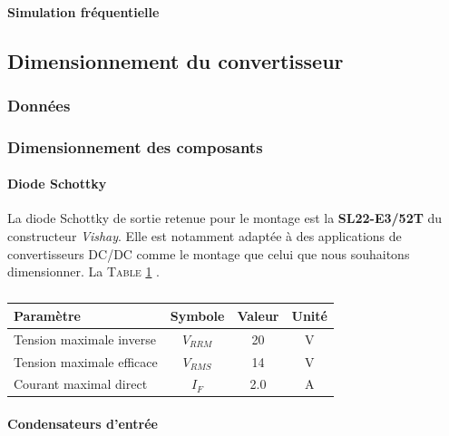 					\paragraph{Simulation fréquentielle}  
					
								
				
			\subsection{Dimensionnement du convertisseur}
			
				\subsubsection{Données }
				
				\subsubsection{Dimensionnement des composants}
				
					\paragraph{Diode Schottky}
					
					La diode Schottky de sortie retenue pour le montage est la \textbf{SL22-E3/52T} du constructeur \textit{Vishay}. Elle est notamment adaptée à des applications de convertisseurs DC/DC comme le montage que celui que nous souhaitons dimensionner. La \textsc{Table \ref{charact_schottky}} \cite{SL22}.
					
					\begin{table}
						\begin{center}
							\begin{tabular}{|l|c|c|c}
							\hline
							Paramètre & Symbole & Valeur & Unité \\
							\hline						
							Tension maximale inverse & $V_{RRM}$ & 20 & V \\
							\hline						
							Tension maximale efficace & $V_{RMS}$ & 14 & V \\
							\hline						
							Courant maximal direct & $I_{F}$ & 2.0 & A \\
							\hline						
							\end{tabular}					
						\end{center}
						\caption{}
						\label{charact_schottky}
					\end{table}
				
					\paragraph{Condensateurs d'entrée}
					
